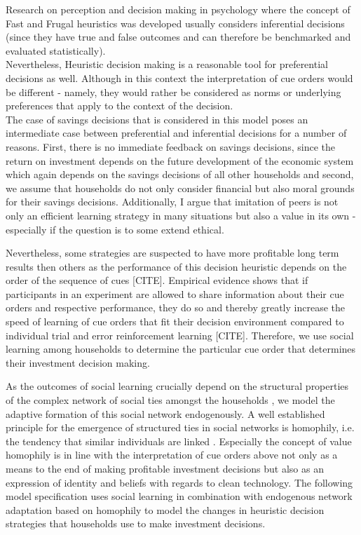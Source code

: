 Research on perception and decision making in psychology where the concept of Fast and Frugal heuristics was developed usually considers inferential decisions (since they have true and false outcomes and can therefore be benchmarked and evaluated statistically).\\
Nevertheless, Heuristic decision making is a reasonable tool for preferential decisions as well. Although in this context the interpretation of cue orders would be different - namely, they would rather be considered as norms or underlying preferences that apply to the context of the decision. \\
The case of savings decisions that is considered in this model poses an intermediate case between preferential and inferential decisions for a number of reasons. First, there is no immediate feedback on savings decisions, since the return on investment depends on the future development of the economic system which again depends on the savings decisions of all other households and second, we assume that households do not only consider financial but also moral grounds for their savings decisions.
Additionally, I argue that imitation of peers is not only an efficient learning strategy in many situations but also a value in its own - especially if the question is to some extend ethical. 

Nevertheless, some strategies are suspected to have more profitable long term results then others as the performance of this decision heuristic depends on the order of the sequence of cues [CITE]. Empirical evidence shows that if participants in an experiment are allowed to share information about their cue orders and respective performance, they do so and thereby greatly increase the speed of learning of cue orders that fit their decision environment compared to individual trial and error reinforcement learning [CITE]. Therefore, we use social learning among households to determine the particular cue order that determines their investment decision making.

As the outcomes of social learning crucially depend on the structural properties of the complex network of social ties amongst the households \cite{Barkoczi2016}, we model the adaptive formation of this social network endogenously.
A well established principle for the emergence of structured ties in social networks is homophily, i.e. the tendency that similar individuals are linked \cite{McPherson2007, Centola2007, Centola2011}. Especially the concept of value homophily \cite{McPherson2007} is in line with the interpretation of cue orders above not only as a means to the end of making profitable investment decisions but also as an expression of identity and beliefs with regards to clean technology.
The following model specification uses social learning in combination with endogenous network adaptation based on homophily to model the changes in heuristic decision strategies that households use to make investment decisions.

